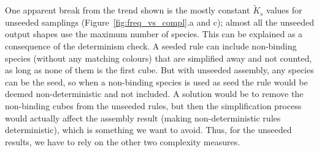 One apparent break from the trend shown is the mostly constant \(\widetilde{K}_s\) values for unseeded samplings (Figure~\ref{fig:freq_vs_compl}.a and c); almost all the unseeded output shapes use the maximum number of species. This can be explained as a consequence of the determinism check. A seeded rule can include non-binding species (without any matching colours) that are simplified away and not counted, as long as none of them is the first cube. But with unseeded assembly, any species can be the seed, so when a non-binding species is used as seed the rule would be deemed non-deterministic and not included. A solution would be to remove the non-binding cubes from the unseeded rules, but then the simplification process would actually affect the assembly result (making non-deterministic rules deterministic), which is something we want to avoid. Thus, for the unseeded results, we have to rely on the other two complexity measures.







